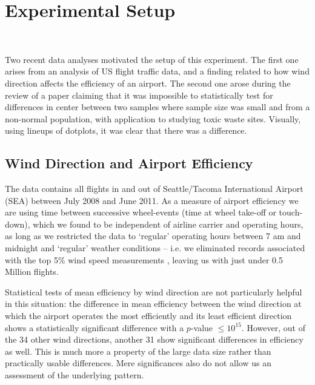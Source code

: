 \section{Experimental Setup}~\label{setup}

Two recent data analyses motivated the setup of this experiment. The first one arises from an analysis of US flight traffic data, and a finding related to how wind direction affects the efficiency of an airport.  The second one arose during the review of a paper claiming that it was impossible to statistically test for differences in center between two samples where sample size was small and from a non-normal population, with application to studying toxic waste sites. Visually, using lineups of dotplots, it was clear that there was a difference.


\subsection{Wind Direction and Airport Efficiency}

The data contains all flights \cite{rita} in and out of Seattle/Tacoma International Airport (SEA) between July 2008 and June 2011. As a measure of airport efficiency we are using time between successive wheel-events (time at wheel take-off or touch-down), which we found to be independent of airline carrier and operating hours, as long as we restricted the data to `regular' operating hours between 7 am and midnight and `regular' weather conditions -- i.e. we eliminated records associated with the top 5\% wind speed measurements \cite{noaa-weather}, leaving us with just under 0.5 Million flights.

Statistical tests of mean efficiency by wind direction are not particularly helpful in this situation: the difference in mean efficiency between the  wind direction at which the airport operates the most efficiently and its least efficient direction shows a statistically significant difference with a $p$-value $\le 10^{15}$. %
However, out of the 34 other wind directions,  another 31 show significant differences in efficiency as well. This is much more a property of the large data size rather than practically usable differences. Mere significances also do not allow us an assessment of the underlying pattern.

